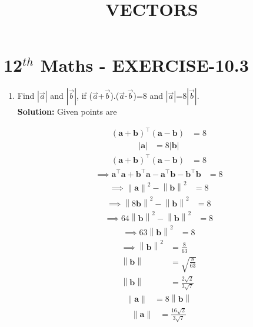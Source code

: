 \documentclass[10pt]{article}
\newcommand{\solution}{\noindent \textbf{Solution: }}
\providecommand{\norm}[1]{\left\lVert#1\right\rVert}
\providecommand{\abs}[1]{\left\vert#1\right\vert}
\let\vec\mathbf{}
\begin{document}
\begin{center}
\title{\textbf{VECTORS}}
\date{\vspace{-5ex}} %
\maketitle
\end{center}

\section{12$^{th}$ Maths - EXERCISE-10.3}

\begin{enumerate}
\item Find $\abs{\overrightarrow{a}}$ and $\abs{\overrightarrow{b}}$, if ($\overrightarrow{a}$+$\overrightarrow{b}$)$.$($\overrightarrow{a}$-$\overrightarrow{b}$)=8 and $\abs{\overrightarrow{a}}$=8$\abs{\overrightarrow{b}}$.\\  

\solution
Given  points are

\begin{align}
(\vec{a}+\vec{b})^{\top}(\vec{a}-\vec{b})&=8
\end{align}
\begin{align}
\abs{\vec{a}}&=8\abs{\vec{b}}
\end{align}
\begin{align}
(\vec{a}+\vec{b})^{\top}(\vec{a}-\vec{b})&=8
\end{align}
\begin{align}
\implies\vec{a}^{\top}\vec{a}+\vec{b}^{\top}\vec{a}-\vec{a}^{\top}\vec{b}-\vec{b}^{\top}\vec{b}&=8
\end{align}
\begin{align}
\implies\norm{\vec{a}}^2-\norm{\vec{b}}^2&=8
\end{align}
\begin{align}
\implies\norm{8\vec{b}}^2-\norm{\vec{b}}^2&=8
\end{align}
\begin{align}
\implies64{\norm{\vec{b}}}^2-\norm{\vec{b}}^2&=8
\end{align}
\begin{align}
\implies63{\norm{\vec{b}}}^2&=8
\end{align}
\begin{align}
\implies\norm{\vec{b}}^2&=\frac{8}{63}\\
\norm{\vec{b}}&=\sqrt{\frac{8}{63}}\\
\norm{\vec{b}}&=\frac{2\sqrt{2}}{3\sqrt{7}}
\end{align}
\begin{align}
\norm{\vec{a}}&=8\norm{\vec{b}}
\end{align}
\begin{align}
\norm{\vec{a}}&=\frac{16\sqrt{2}}{3\sqrt{7}}
\end{align}
\end{enumerate}
\end{document}
